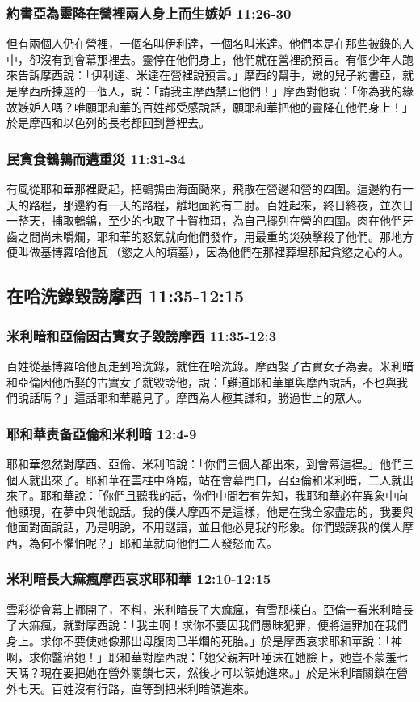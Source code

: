 \subsubsection{約書亞為靈降在營裡兩人身上而生嫉妒 11:26-30}
但有兩個人仍在營裡，一個名叫伊利達，一個名叫米達。他們本是在那些被錄的人中，卻沒有到會幕那裡去。靈停在他們身上，他們就在營裡說預言。有個少年人跑來告訴摩西說：「伊利達、米達在營裡說預言。」摩西的幫手，嫩的兒子約書亞，就是摩西所揀選的一個人，說：「請我主摩西禁止他們！」摩西對他說：「你為我的緣故嫉妒人嗎？唯願耶和華的百姓都受感說話，願耶和華把他的靈降在他們身上！」於是摩西和以色列的長老都回到營裡去。

\subsubsection{民貪食鵪鶉而遘重災 11:31-34}
有風從耶和華那裡颳起，把鵪鶉由海面颳來，飛散在營邊和營的四圍。這邊約有一天的路程，那邊約有一天的路程，離地面約有二肘。百姓起來，終日終夜，並次日一整天，捕取鵪鶉，至少的也取了十賀梅珥，為自己擺列在營的四圍。肉在他們牙齒之間尚未嚼爛，耶和華的怒氣就向他們發作，用最重的災殃擊殺了他們。那地方便叫做基博羅哈他瓦 （慾之人的墳墓），因為他們在那裡葬埋那起貪慾之心的人。 

\subsection{在哈洗錄毀謗摩西 11:35-12:15}
\subsubsection{米利暗和亞倫因古實女子毀謗摩西 11:35-12:3}
百姓從基博羅哈他瓦走到哈洗錄，就住在哈洗錄。摩西娶了古實女子為妻。米利暗和亞倫因他所娶的古實女子就毀謗他，說：「難道耶和華單與摩西說話，不也與我們說話嗎？」這話耶和華聽見了。摩西為人極其謙和，勝過世上的眾人。

\subsubsection{耶和華责备亞倫和米利暗 12:4-9}
耶和華忽然對摩西、亞倫、米利暗說：「你們三個人都出來，到會幕這裡。」他們三個人就出來了。耶和華在雲柱中降臨，站在會幕門口，召亞倫和米利暗，二人就出來了。耶和華說：「你們且聽我的話，你們中間若有先知，我耶和華必在異象中向他顯現，在夢中與他說話。我的僕人摩西不是這樣，他是在我全家盡忠的，我要與他面對面說話，乃是明說，不用謎語，並且他必見我的形象。你們毀謗我的僕人摩西，為何不懼怕呢？」耶和華就向他們二人發怒而去。

\subsubsection{米利暗長大痲瘋摩西哀求耶和華 12:10-12:15}
雲彩從會幕上挪開了，不料，米利暗長了大痲瘋，有雪那樣白。亞倫一看米利暗長了大痲瘋，就對摩西說：「我主啊！求你不要因我們愚昧犯罪，便將這罪加在我們身上。求你不要使她像那出母腹肉已半爛的死胎。」於是摩西哀求耶和華說：「神啊，求你醫治她！」耶和華對摩西說：「她父親若吐唾沫在她臉上，她豈不蒙羞七天嗎？現在要把她在營外關鎖七天，然後才可以領她進來。」於是米利暗關鎖在營外七天。百姓沒有行路，直等到把米利暗領進來。

